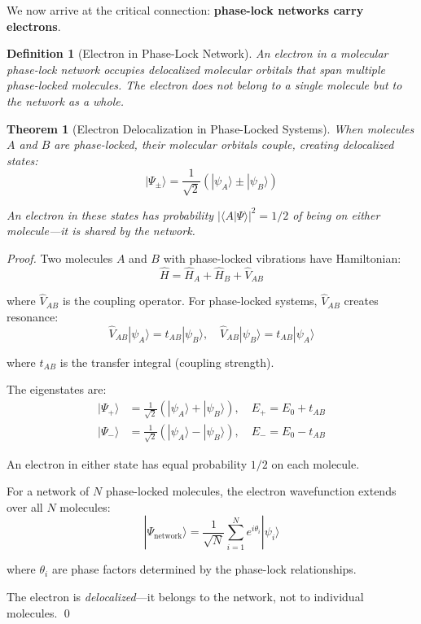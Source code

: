\documentclass[12pt,a4paper]{article}
\newtheorem{theorem}{Theorem}
\newtheorem{definition}{Definition}
\begin{document}
We now arrive at the critical connection: \textbf{phase-lock networks carry electrons}.

\begin{definition}[Electron in Phase-Lock Network]
\label{def:electron_network}
An electron in a molecular phase-lock network occupies delocalized molecular orbitals that span multiple phase-locked molecules. The electron does not belong to a single molecule but to the network as a whole.
\end{definition}

\begin{theorem}[Electron Delocalization in Phase-Locked Systems]
\label{thm:electron_delocalization}
When molecules $A$ and $B$ are phase-locked, their molecular orbitals couple, creating delocalized states:
\begin{equation}
|\Psi_{\pm}\rangle = \frac{1}{\sqrt{2}} \left(|\psi_A\rangle \pm |\psi_B\rangle\right)
\end{equation}

An electron in these states has probability $|\langle A | \Psi \rangle|^2 = 1/2$ of being on either molecule—it is \textit{shared} by the network.
\end{theorem}

\begin{proof}
Two molecules $A$ and $B$ with phase-locked vibrations have Hamiltonian:
\begin{equation}
\hat{H} = \hat{H}_A + \hat{H}_B + \hat{V}_{AB}
\end{equation}

where $\hat{V}_{AB}$ is the coupling operator. For phase-locked systems, $\hat{V}_{AB}$ creates resonance:
\begin{equation}
\hat{V}_{AB} |\psi_A\rangle = t_{AB} |\psi_B\rangle, \quad \hat{V}_{AB} |\psi_B\rangle = t_{AB} |\psi_A\rangle
\end{equation}

where $t_{AB}$ is the transfer integral (coupling strength).

The eigenstates are:
\begin{align}
|\Psi_+\rangle &= \frac{1}{\sqrt{2}} (|\psi_A\rangle + |\psi_B\rangle), \quad E_+ = E_0 + t_{AB} \\
|\Psi_-\rangle &= \frac{1}{\sqrt{2}} (|\psi_A\rangle - |\psi_B\rangle), \quad E_- = E_0 - t_{AB}
\end{align}

An electron in either state has equal probability $1/2$ on each molecule.

For a network of $N$ phase-locked molecules, the electron wavefunction extends over all $N$ molecules:
\begin{equation}
|\Psi_{\text{network}}\rangle = \frac{1}{\sqrt{N}} \sum_{i=1}^{N} e^{i\theta_i} |\psi_i\rangle
\end{equation}

where $\theta_i$ are phase factors determined by the phase-lock relationships.

The electron is \textit{delocalized}—it belongs to the network, not to individual molecules. \qed
\end{proof}
\end{document}
